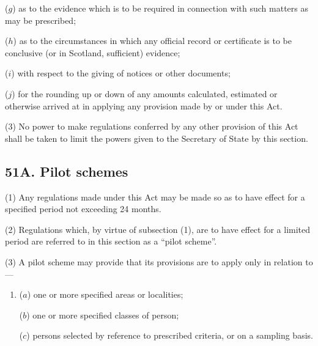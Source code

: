 \documentclass[12pt,a4paper]{article}
\begin{document}
\begin{enumerate}
($g$) as to the evidence which is to be required in connection with such matters
as may be prescribed;

($h$) as to the circumstances in which any official record or certificate is to be
conclusive (or in Scotland, sufficient) evidence;

($i$) with respect to the giving of notices or other documents;

($j$) for the rounding up or down of any amounts calculated, estimated or
otherwise arrived at in applying any provision made by or under this Act.
\end{enumerate}

(3)
No power to make regulations conferred by any other provision of this Act shall be taken to limit the powers given to the Secretary of State by this section.


\subsection{51A. Pilot schemes}

(1) Any regulations made under this Act may be made so as to have effect for a specified period not exceeding 24 months.

(2)
Regulations which, by virtue of subsection (1), are to have effect for a limited period are referred to in this section as a “pilot scheme”.

(3) A pilot scheme may provide that its provisions are to apply only in relation to---
\begin{enumerate}\item[]
($a$) one or more specified areas or localities;

($b$) one or more specified classes of person;

($c$) persons selected by reference to prescribed criteria, or on a sampling basis.
\end{enumerate}
\end{document}
